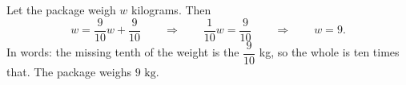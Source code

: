Let the package weigh $w$ kilograms. Then
\[
w=\dfrac{9}{10}w+\dfrac{9}{10}\qquad\Longrightarrow\qquad \dfrac{1}{10}w=\dfrac{9}{10}\qquad\Longrightarrow\qquad w=9 .
\]
In words: the missing tenth of the weight is the $\dfrac{9}{10}$ kg, so the whole is ten times that. The package weighs $\boxed{9\text{ kg}}$.
